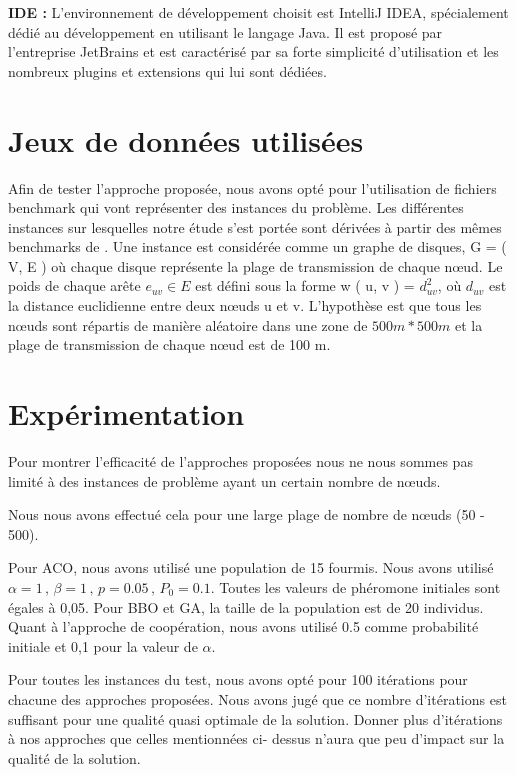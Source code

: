 \textbf{IDE :}
L’environnement de développement choisit est IntelliJ IDEA, spécialement dédié au développement en utilisant le langage Java. Il est proposé par l’entreprise JetBrains et est caractérisé par sa forte simplicité d’utilisation et les nombreux plugins et extensions qui lui sont dédiées.

\section{Jeux de données utilisées}
Afin de tester l'approche proposée, nous avons opté pour l'utilisation de fichiers benchmark qui vont représenter des instances du problème. Les différentes instances sur lesquelles notre étude s'est portée sont dérivées à partir des mêmes benchmarks de \cite{sundar2013new}. Une instance est considérée comme un graphe de disques, G = ( V, E ) où chaque disque représente la plage de transmission de chaque nœud. Le poids de chaque arête $e_{uv} \in E $ est défini sous la forme w ( u, v ) = $d_{uv}^2$, où $d_{uv}$  est la distance euclidienne entre deux nœuds u et v. L'hypothèse est que tous les nœuds sont répartis de manière aléatoire dans une zone de $500m * 500m $  et la plage de transmission de chaque nœud est de 100 m.


\section{Expérimentation}
Pour montrer l'efficacité de l'approches proposées nous ne nous sommes pas limité à des instances de problème ayant un certain nombre de nœuds.

Nous nous avons effectué cela pour une large plage de nombre de nœuds (50 - 500).

Pour ACO, nous avons utilisé une population de 15 fourmis. Nous avons utilisé $\alpha = 1 \, , \, \beta = 1 \, , \, p = 0.05 \, , \, P_0 = 0.1 $. Toutes les valeurs de phéromone initiales sont égales à 0,05. Pour BBO et GA, la taille de la population est de 20 individus. Quant à l’approche de coopération,  nous avons utilisé 0.5 comme probabilité initiale et 0,1 pour la valeur de  \( \alpha \).

Pour toutes les instances du test, nous avons opté pour 100 itérations pour chacune des approches proposées. Nous avons jugé que ce nombre d'itérations est suffisant pour une qualité quasi optimale de la solution. Donner plus d'itérations à nos approches que celles mentionnées ci- dessus n'aura que peu d'impact sur la qualité de la solution. 

